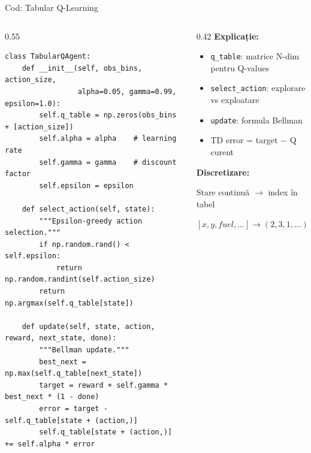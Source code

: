\documentclass[aspectratio=169]{beamer}
\begin{document}
\begin{frame}[fragile]{Cod: Tabular Q-Learning}
  \begin{columns}
    \begin{column}{0.55\textwidth}
      \begin{lstlisting}[style=pythonstyle]
class TabularQAgent:
    def __init__(self, obs_bins, action_size, 
                 alpha=0.05, gamma=0.99, epsilon=1.0):
        self.q_table = np.zeros(obs_bins + [action_size])
        self.alpha = alpha    # learning rate
        self.gamma = gamma    # discount factor
        self.epsilon = epsilon

    def select_action(self, state):
        """Epsilon-greedy action selection."""
        if np.random.rand() < self.epsilon:
            return np.random.randint(self.action_size)
        return np.argmax(self.q_table[state])

    def update(self, state, action, reward, next_state, done):
        """Bellman update."""
        best_next = np.max(self.q_table[next_state])
        target = reward + self.gamma * best_next * (1 - done)
        error = target - self.q_table[state + (action,)]
        self.q_table[state + (action,)] += self.alpha * error
      \end{lstlisting}
    \end{column}
    \begin{column}{0.42\textwidth}
      \textbf{Explicație:}
      \begin{itemize}
        \item \texttt{q\_table}: matrice N-dim pentru Q-values
        \item \texttt{select\_action}: explorare vs exploatare
        \item \texttt{update}: formula Bellman
        \item TD error = target $-$ Q curent
      \end{itemize}
      
      \vspace{0.3cm}
      \textbf{Discretizare:}
      
      Stare continuă $\to$ index în tabel
      
      $[x, y, fuel, ...] \to (2, 3, 1, ...)$
    \end{column}
  \end{columns}
\end{frame}
\end{document}
